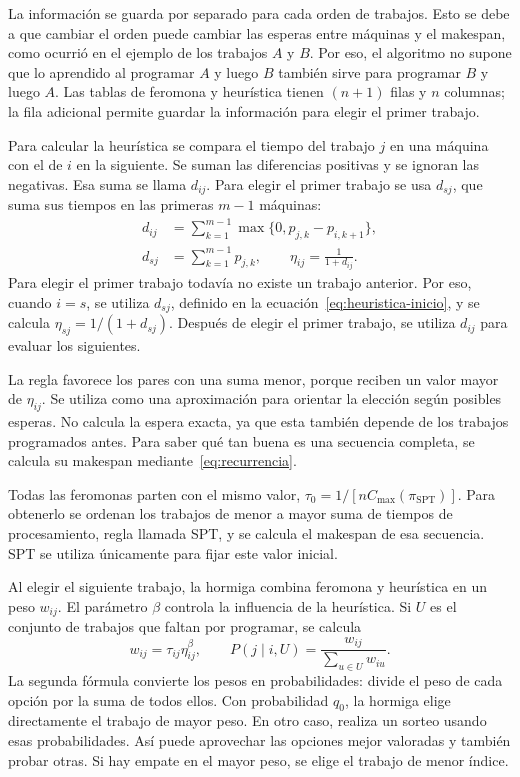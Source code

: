 \documentclass[journal]{IEEEtran}
\begin{document}
La información se guarda por separado para cada orden de trabajos. Esto se debe a que cambiar el orden puede cambiar las esperas entre máquinas y el makespan, como ocurrió en el ejemplo de los trabajos $A$ y $B$. Por eso, el algoritmo no supone que lo aprendido al programar $A$ y luego $B$ también sirve para programar $B$ y luego $A$. Las tablas de feromona y heurística tienen $(n+1)$ filas y $n$ columnas; la fila adicional permite guardar la información para elegir el primer trabajo.

Para calcular la heurística se compara el tiempo del trabajo $j$ en una máquina con el de $i$ en la siguiente. Se suman las diferencias positivas y se ignoran las negativas. Esa suma se llama $d_{ij}$. Para elegir el primer trabajo se usa $d_{sj}$, que suma sus tiempos en las primeras $m-1$ máquinas:
\begin{align}
d_{ij}&=\sum_{k=1}^{m-1}\max\{0,p_{j,k}-p_{i,k+1}\},\\
d_{sj}&=\sum_{k=1}^{m-1}p_{j,k},\qquad
\eta_{ij}=\frac{1}{1+d_{ij}}.\label{eq:heuristica-inicio}
\end{align}
Para elegir el primer trabajo todavía no existe un trabajo anterior. Por eso, cuando $i=s$, se utiliza $d_{sj}$, definido en la ecuación~\eqref{eq:heuristica-inicio}, y se calcula $\eta_{sj}=1/(1+d_{sj})$. Después de elegir el primer trabajo, se utiliza $d_{ij}$ para evaluar los siguientes.

La regla favorece los pares con una suma menor, porque reciben un valor mayor de $\eta_{ij}$. Se utiliza como una aproximación para orientar la elección según posibles esperas. No calcula la espera exacta, ya que esta también depende de los trabajos programados antes. Para saber qué tan buena es una secuencia completa, se calcula su makespan mediante~\eqref{eq:recurrencia}.

Todas las feromonas parten con el mismo valor, $\tau_0=1/[nC_{\max}(\pi_{\mathrm{SPT}})]$. Para obtenerlo se ordenan los trabajos de menor a mayor suma de tiempos de procesamiento, regla llamada SPT, y se calcula el makespan de esa secuencia. SPT se utiliza únicamente para fijar este valor inicial.

Al elegir el siguiente trabajo, la hormiga combina feromona y heurística en un peso $w_{ij}$. El parámetro $\beta$ controla la influencia de la heurística. Si $U$ es el conjunto de trabajos que faltan por programar, se calcula
\begin{equation}
w_{ij}=\tau_{ij}\eta_{ij}^{\beta},\qquad
P(j\mid i,U)=\frac{w_{ij}}{\sum_{u\in U}w_{iu}}.
\end{equation}
La segunda fórmula convierte los pesos en probabilidades: divide el peso de cada opción por la suma de todos ellos. Con probabilidad $q_0$, la hormiga elige directamente el trabajo de mayor peso. En otro caso, realiza un sorteo usando esas probabilidades. Así puede aprovechar las opciones mejor valoradas y también probar otras. Si hay empate en el mayor peso, se elige el trabajo de menor índice.
\end{document}
